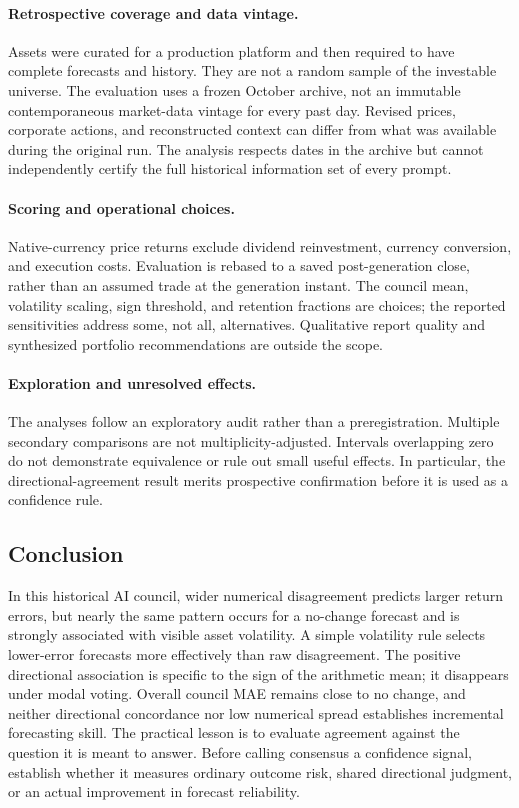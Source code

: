 \documentclass[11pt]{article}
\begin{document}
\paragraph{Retrospective coverage and data vintage.} Assets were curated for a production platform and then required to have complete forecasts and history. They are not a random sample of the investable universe. The evaluation uses a frozen October archive, not an immutable contemporaneous market-data vintage for every past day. Revised prices, corporate actions, and reconstructed context can differ from what was available during the original run. The analysis respects dates in the archive but cannot independently certify the full historical information set of every prompt.

\paragraph{Scoring and operational choices.} Native-currency price returns exclude dividend reinvestment, currency conversion, and execution costs. Evaluation is rebased to a saved post-generation close, rather than an assumed trade at the generation instant. The council mean, volatility scaling, sign threshold, and retention fractions are choices; the reported sensitivities address some, not all, alternatives. Qualitative report quality and synthesized portfolio recommendations are outside the scope.

\paragraph{Exploration and unresolved effects.} The analyses follow an exploratory audit rather than a preregistration. Multiple secondary comparisons are not multiplicity-adjusted. Intervals overlapping zero do not demonstrate equivalence or rule out small useful effects. In particular, the directional-agreement result merits prospective confirmation before it is used as a confidence rule.

\begin{samepage}
\section{Conclusion}
In this historical AI council, wider numerical disagreement predicts larger return errors, but nearly the same pattern occurs for a no-change forecast and is strongly associated with visible asset volatility. A simple volatility rule selects lower-error forecasts more effectively than raw disagreement. The positive directional association is specific to the sign of the arithmetic mean; it disappears under modal voting. Overall council MAE remains close to no change, and neither directional concordance nor low numerical spread establishes incremental forecasting skill. The practical lesson is to evaluate agreement against the question it is meant to answer. Before calling consensus a confidence signal, establish whether it measures ordinary outcome risk, shared directional judgment, or an actual improvement in forecast reliability.

\end{samepage}
\end{document}
